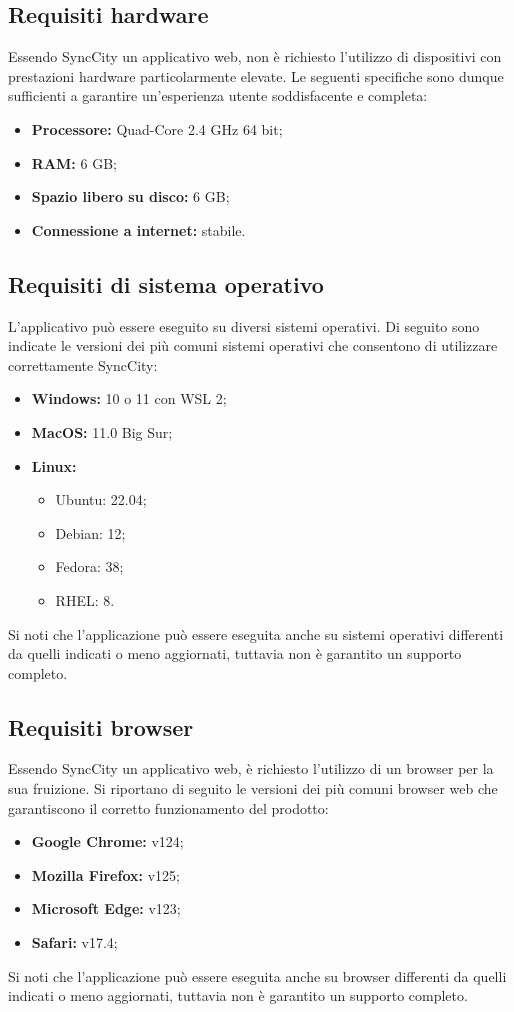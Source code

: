 \documentclass[8pt]{article}
\begin{document}
\subsection{Requisiti hardware}
Essendo SyncCity un applicativo web, non è richiesto l'utilizzo di dispositivi con prestazioni hardware particolarmente elevate. Le seguenti specifiche sono dunque sufficienti a garantire un'esperienza utente soddisfacente e completa:  
\begin{itemize}
\setlength\itemsep{0em}
    \item \textbf{Processore:} Quad-Core 2.4 GHz 64 bit;
    \item \textbf{RAM:} 6 GB;
    \item \textbf{Spazio libero su disco:} 6 GB;
    \item \textbf{Connessione a internet:} stabile.
\end{itemize}
\subsection{Requisiti di sistema operativo}
L'applicativo può essere eseguito su diversi sistemi operativi. Di seguito sono indicate le versioni dei più comuni sistemi operativi che consentono di utilizzare correttamente SyncCity:
\begin{itemize}
\setlength\itemsep{0em}
    \item \textbf{Windows:} 10 o 11 con WSL 2;
    \item \textbf{MacOS:} 11.0 Big Sur;
    \item \textbf{Linux:}
    \begin{itemize}
        \item Ubuntu: 22.04;
        \item Debian: 12;
        \item Fedora: 38;
        \item RHEL: 8.
    \end{itemize}
\end{itemize}
Si noti che l'applicazione può essere eseguita anche su sistemi operativi differenti da quelli indicati o meno aggiornati, tuttavia non è garantito un supporto completo.
\subsection{Requisiti browser}
Essendo SyncCity un applicativo web, è richiesto l'utilizzo di un browser per la sua fruizione. Si riportano di seguito le versioni dei più comuni browser web che garantiscono il corretto funzionamento del prodotto:
\begin{itemize}
\setlength\itemsep{0em}
    \item \textbf{Google Chrome:} v124;
    \item \textbf{Mozilla Firefox:} v125;
    \item \textbf{Microsoft Edge:} v123;
    \item \textbf{Safari:} v17.4;
\end{itemize}
Si noti che l'applicazione può essere eseguita anche su browser differenti da quelli indicati o meno aggiornati, tuttavia non è garantito un supporto completo.
\newpage
\end{document}
